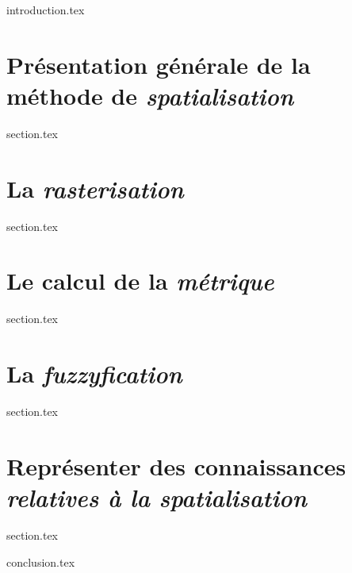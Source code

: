 \chaptertoc{}

\label{chap:07-int}
{introduction.tex}

\section{Présentation générale de la méthode de \emph{spatialisation}}
\label{chap:07-sec1}
{section.tex}

\section{La \emph{rasterisation}}
\label{chap:07-sec2}
{section.tex}

\section{Le calcul de la \emph{métrique}}
\label{chap:07-sec3}
{section.tex}

\section{La \emph{fuzzyfication}}
\label{chap:07-sec4}
{section.tex}

\section{Représenter des connaissances \emph{relatives à la spatialisation}}
\label{chap:07-sec5}
{section.tex}

\label{chap:07-cnc}
{conclusion.tex}

